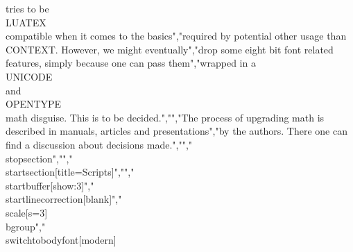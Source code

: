 tries to be \\LUATEX\\ compatible when it comes to the basics","required by potential other usage than \\CONTEXT. However, we might eventually","drop some eight bit font related features, simply because one can pass them","wrapped in a \\UNICODE\\ and \\OPENTYPE\\ math disguise. This is to be decided.","","The process of upgrading math is described in manuals, articles and presentations","by the authors. There one can find a discussion about decisions made.","","\\stopsection","","\\startsection[title={Scripts}]","","\\startbuffer[show:3]","\\startlinecorrection[blank]","    \\scale[s=3]\\bgroup","        \\switchtobodyfont[modern]%